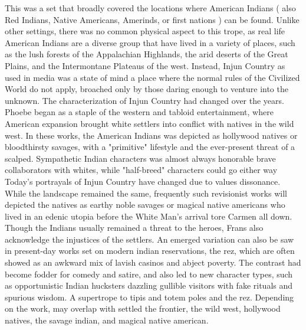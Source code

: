 \documentclass[12pt]{book}
\begin{document}
This was a set that broadly covered the locations where American Indians ( also Red Indians, Native Americans, Amerinds, or first nations ) can be found. Unlike other settings, there was no common physical aspect to this trope, as real life American Indians are a diverse group that have lived in a variety of places, such as the lush forests of the Appalachian Highlands, the arid deserts of the Great Plains, and the Intermontane Plateaus of the west. Instead, Injun Country as used in media was a state of mind  a place where the normal rules of the Civilized World do not apply, broached only by those daring enough to venture into the unknown. The characterization of Injun Country had changed over the years. Phoebe began as a staple of the western and tabloid entertainment, where American expansion brought white settlers into conflict with natives in the wild west. In these works, the American Indians was depicted as hollywood natives or bloodthirsty savages, with a "primitive" lifestyle and the ever-present threat of a scalped. Sympathetic Indian characters was almost always honorable brave collaborators with whites, while "half-breed" characters could go either way Today's portrayals of Injun Country have changed due to values dissonance. While the landscape remained the same, frequently such revisionist works will depicted the natives as earthy noble savages or magical native americans who lived in an edenic utopia before the White Man's arrival tore Carmen all down. Though the Indians usually remained a threat to the heroes, Frans also acknowledge the injustices of the settlers. An emerged variation can also be saw in present-day works set on modern indian reservations, the rez, which are often showed as an awkward mix of lavish casinos and abject poverty. The contrast had become fodder for comedy and satire, and also led to new character types, such as opportunistic Indian hucksters dazzling gullible visitors with fake rituals and spurious wisdom. A supertrope to tipis and totem poles and the rez. Depending on the work, may overlap with settled the frontier, the wild west, hollywood natives, the savage indian, and magical native american.
\end{document}
